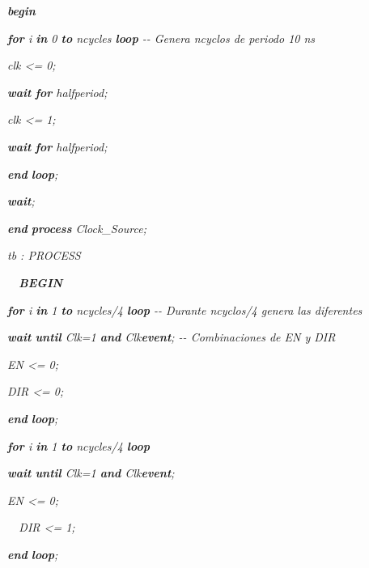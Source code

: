 {\itshape
 \textbf{begin}}

{\itshape
 \textbf{for} i \textbf{in} 0 \textbf{to} ncycles \textbf{loop}  {}-{}-
Genera ncyclos de periodo 10 ns}

{\itshape
 clk {\textless}= {\textquotesingle}0{\textquotesingle};}

{\itshape
 \textbf{wait} \textbf{for} halfperiod;}

{\itshape
 clk {\textless}= {\textquotesingle}1{\textquotesingle};}

{\itshape
 \textbf{wait} \textbf{for} halfperiod;}

{\itshape
 \textbf{end} \textbf{loop};}

{\itshape
 \textbf{wait};}

{\itshape
 \textbf{end} \textbf{process} Clock\_Source;}

{\itshape
 tb : PROCESS}

{\itshape
\ \ \textbf{BEGIN}}

{\itshape
 \textbf{for} i \textbf{in} 1 \textbf{to} ncycles/4 \textbf{loop 
}{}-{}- Durante ncyclos/4 genera las diferentes}

{\itshape
\foreignlanguage{english}{
}\foreignlanguage{spanish}{\textbf{wait}}\foreignlanguage{spanish}{
}\foreignlanguage{spanish}{\textbf{until}}\foreignlanguage{spanish}{
Clk={\textquotesingle}1{\textquotesingle}
}\foreignlanguage{spanish}{\textbf{and}}\foreignlanguage{spanish}{
Clk}\foreignlanguage{spanish}{\textbf{{\textquotesingle}event}}\foreignlanguage{spanish}{;
 {}-{}- Combinaciones de EN y DIR}}

{\itshape
 EN  {\textless}= {\textquotesingle}0{\textquotesingle};}

{\itshape
\foreignlanguage{spanish}{ }\foreignlanguage{english}{DIR {\textless}=
{\textquotesingle}0{\textquotesingle};}}

{\itshape
 \textbf{end} \textbf{loop};}

{\itshape
 \textbf{for} i \textbf{in} 1 \textbf{to} ncycles/4 \textbf{loop}}

{\itshape
 \textbf{wait} \textbf{until} Clk={\textquotesingle}1{\textquotesingle}
\textbf{and} Clk{\textquotesingle}\textbf{event};}

{\itshape
\foreignlanguage{english}{ }\foreignlanguage{spanish}{EN  {\textless}=
{\textquotesingle}0{\textquotesingle};}}

{\itshape
\ \   DIR {\textless}= {\textquotesingle}1{\textquotesingle};}

{\itshape
\foreignlanguage{spanish}{
}\foreignlanguage{english}{\textbf{end}}\foreignlanguage{english}{
}\foreignlanguage{english}{\textbf{loop}}\foreignlanguage{english}{; 
}}


